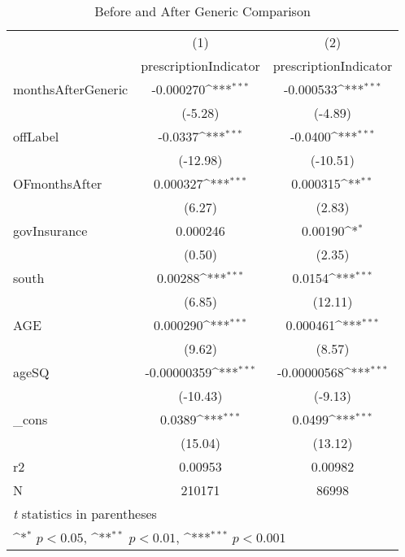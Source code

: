 \begin{table}[htbp]\centering
\def\sym#1{\ifmmode^{#1}\else\(^{#1}\)\fi}
\caption{Before and After Generic Comparison\label{tab1}}
\begin{tabular}{l*{2}{c}}
\hline\hline
            &\multicolumn{1}{c}{(1)}&\multicolumn{1}{c}{(2)}\\
            &\multicolumn{1}{c}{prescriptionIndicator}&\multicolumn{1}{c}{prescriptionIndicator}\\
\hline
monthsAfterGeneric&   -0.000270\sym{***}&   -0.000533\sym{***}\\
            &     (-5.28)         &     (-4.89)         \\
[1em]
offLabel    &     -0.0337\sym{***}&     -0.0400\sym{***}\\
            &    (-12.98)         &    (-10.51)         \\
[1em]
OFmonthsAfter&    0.000327\sym{***}&    0.000315\sym{**} \\
            &      (6.27)         &      (2.83)         \\
[1em]
govInsurance&    0.000246         &     0.00190\sym{*}  \\
            &      (0.50)         &      (2.35)         \\
[1em]
south       &     0.00288\sym{***}&      0.0154\sym{***}\\
            &      (6.85)         &     (12.11)         \\
[1em]
AGE         &    0.000290\sym{***}&    0.000461\sym{***}\\
            &      (9.62)         &      (8.57)         \\
[1em]
ageSQ       & -0.00000359\sym{***}& -0.00000568\sym{***}\\
            &    (-10.43)         &     (-9.13)         \\
[1em]
\_cons      &      0.0389\sym{***}&      0.0499\sym{***}\\
            &     (15.04)         &     (13.12)         \\
\hline
r2          &     0.00953         &     0.00982         \\
N           &      210171         &       86998         \\
\hline\hline
\multicolumn{3}{l}{\footnotesize \textit{t} statistics in parentheses}\\
\multicolumn{3}{l}{\footnotesize \sym{*} \(p<0.05\), \sym{**} \(p<0.01\), \sym{***} \(p<0.001\)}\\
\end{tabular}
\end{table}
